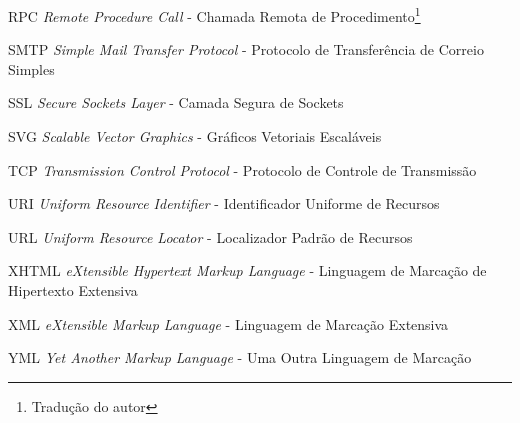 \begin{siglas}
	\item[RPC] \textit{Remote Procedure Call} - Chamada Remota de Procedimento\footnote{Tradução do autor}
	\item[SMTP] \textit{Simple Mail Transfer Protocol} - Protocolo de Transferência de Correio Simples
	\item[SSL] \textit{Secure Sockets Layer} - Camada Segura de Sockets
	\item[SVG] \textit{Scalable Vector Graphics} - Gráficos Vetoriais Escaláveis
	\item[TCP] \textit{Transmission Control Protocol} - Protocolo de Controle de Transmissão
	\item[URI] \textit{Uniform Resource Identifier} - Identificador Uniforme de Recursos
	\item[URL] \textit{Uniform Resource Locator} - Localizador Padrão de Recursos
	\item[XHTML] \textit{eXtensible Hypertext Markup Language} - Linguagem de Marcação de Hipertexto Extensiva
	\item[XML] \textit{eXtensible Markup Language} - Linguagem de Marcação Extensiva
	\item[YML] \textit{Yet Another Markup Language} - Uma Outra Linguagem de Marcação\footnotemark[2]
\end{siglas}

